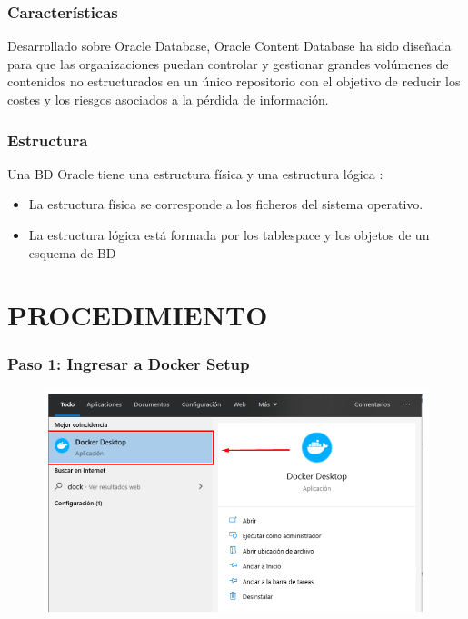 \documentclass[preprint,12pt]{elsarticle}
\begin{document}
\subsubsection{\textbf{Características}}
Desarrollado sobre Oracle Database, Oracle Content Database ha sido diseñada para que las organizaciones puedan controlar y gestionar grandes volúmenes de contenidos no estructurados en un único repositorio con el objetivo de reducir los costes y los riesgos asociados a la pérdida de información. 


\subsubsection{\textbf{Estructura}}
Una BD Oracle tiene una estructura física y una estructura lógica : 
\begin{itemize}
	\item La estructura física se corresponde a los ficheros del sistema operativo.
	\item La estructura lógica está formada por los tablespace y los objetos de un esquema de BD 
\end{itemize}


\section{PROCEDIMIENTO}


\subsubsection{\textbf{Paso 1: Ingresar a Docker Setup}}
\begin{figure}[H]
	\begin{center}
		\includegraphics[width=12cm]{./IMAGENES/foto1} 
	\end{center}
\end{figure}
\end{document}
